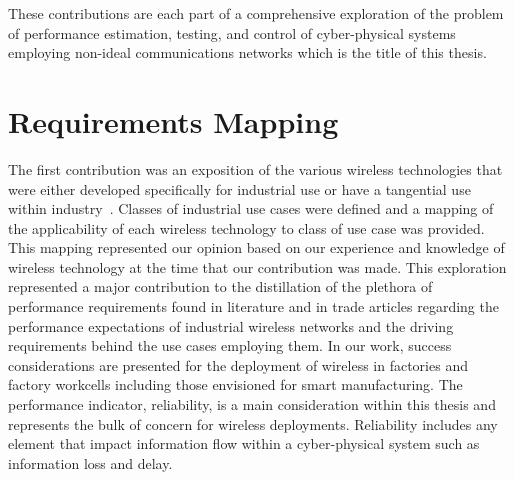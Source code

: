These contributions are each part of a comprehensive exploration of the problem of performance estimation, testing, and control of cyber-physical systems employing non-ideal communications networks which is the title of this thesis.  

\section{Requirements Mapping}

The first contribution was an exposition of the various wireless technologies that were either developed specifically for industrial use or have a tangential use within industry~\cite{CandellRW2017}.  Classes of industrial use cases were defined and a mapping of the applicability of each wireless technology to class of use case was provided.  This mapping represented our opinion based on our experience and knowledge of wireless technology at the time that our contribution was made.  This exploration represented a major contribution to the distillation of the plethora of performance requirements found in literature and in trade articles regarding the performance expectations of industrial wireless networks and the driving requirements behind the use cases employing them.  In our work, success considerations are presented for the deployment of wireless in factories and factory workcells including those envisioned for smart manufacturing.  The performance indicator, reliability, is a main consideration within this thesis and represents the bulk of  concern for wireless deployments.  Reliability includes any element that impact information flow within a cyber-physical system such as information loss and delay.  


